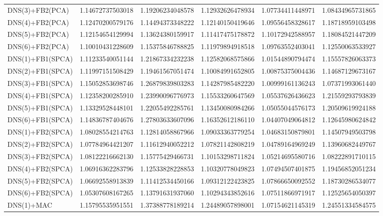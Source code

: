 \begin{table}[htb]
\begin{adjustbox}{totalheight=\baselineskip}
\begin{tabular}{lSSSSS}
DNS(3)+FB2(PCA) & 1.14672737503018 & 1.19206234048578 & 1.12932626478934 & 1.07734411448971 & 1.08434965731865 \\ 
DNS(4)+FB2(PCA) & 1.12470200579176 & 1.14494373348222 & 1.12140150419646 & 1.09556458328617 & 1.18718959103498 \\ 
DNS(5)+FB2(PCA) & 1.12154654129994 & 1.13624380159917 & 1.11417475178872 & 1.10172942588957 & 1.18084521447209 \\ 
DNS(6)+FB2(PCA) & 1.10010431228609 & 1.15375846788825 & 1.11979894918518 & 1.09763552403041 & 1.12550063533927 \\ 
DNS(1)+FB1(SPCA) & 1.11233540051144 & 1.21867334232238 & 1.12582068575866 & 1.01544890794474 & 1.15557826063373 \\ 
DNS(2)+FB1(SPCA) & 1.11997151508429 & 1.19461567051474 & 1.10084991652805 & 1.00875375004436 & 1.14687129673167 \\ 
DNS(3)+FB1(SPCA) & 1.15052853698746 & 1.26879839803283 & 1.14287985482220 & 1.00999161136243 & 1.07371993061440 \\ 
DNS(4)+FB1(SPCA) & 1.12358200285910 & 1.23990096776973 & 1.15533260647569 & 1.05537626436623 & 1.21559293793839 \\ 
DNS(5)+FB1(SPCA) & 1.13329528448101 & 1.22055492285761 & 1.13450080984266 & 1.05055044576173 & 1.20509619924188 \\ 
DNS(6)+FB1(SPCA) & 1.14836787404676 & 1.27803633607096 & 1.16352612186110 & 1.04407049064812 & 1.12645980624842 \\ 
DNS(1)+FB2(SPCA) & 1.08028554214763 & 1.12814058867966 & 1.09033363779254 & 1.04683150879801 & 1.14507949503798 \\ 
DNS(2)+FB2(SPCA) & 1.07784964421207 & 1.11612940052212 & 1.07821142808219 & 1.04789164969249 & 1.13960682449767 \\ 
DNS(3)+FB2(SPCA) & 1.08122216662130 & 1.15775429466731 & 1.10153298711824 & 1.05214695580716 & 1.08222891710115 \\ 
DNS(4)+FB2(SPCA) & 1.06916362283796 & 1.12533828228853 & 1.10320778049823 & 1.07494507401875 & 1.19456852051234 \\ 
DNS(5)+FB2(SPCA) & 1.06692558913839 & 1.11412534450166 & 1.09312122423825 & 1.07866650092552 & 1.18730286534077 \\ 
DNS(6)+FB2(SPCA) & 1.05307608167265 & 1.13791631937060 & 1.10294343852616 & 1.07511866971917 & 1.12525654050397 \\ 
DNS(1)+MAC & 1.15795535951551 & 1.37388778189214 & 1.24489057898001 & 1.07154621145319 & 1.24551334584575 \\ 

\end{tabular}
\end{adjustbox}
\end{table}

